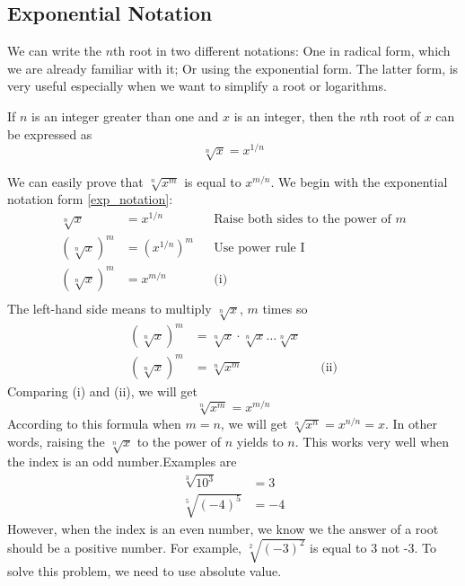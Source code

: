 \subsection{Exponential Notation}
We can write the $n$th root in two different notations: One in radical form, which
we are already familiar with it; Or using the exponential form. The latter form,
is very useful especially when we want to simplify a root or logarithms.
\begin{tcolorbox}[title=Exponential Notation, fonttitle=\bfseries,
                 colframe=blue!70!red,
                 colback =white]
If $n$ is an integer greater than one and $x$ is an integer, then the $n$th root of $x$ can be expressed as 
						\begin{equation}
 								\sqrt[n]{x}=x^{1/n} \label{exp_notation}
 						\end{equation}	
\end{tcolorbox}
We can easily prove that $\sqrt[n]{x^m}$ is equal to $x^{m/n}$. We begin with the exponential notation form \eqref{exp_notation}:
\begin{align*}
		\sqrt[n]{x} &= x^{1/n} 		&&\text{Raise both sides to the power of $m$}\\
		\left(\sqrt[n]{x}\right)^{m} &= \left(x^{1/n}\right)^m &&\text{Use power rule I}\\
		\left(\sqrt[n]{x}\right)^{m} &= x^{m/n} &&\text{(i)}\\
\end{align*}
The left-hand side means to multiply $\sqrt[n]{x}$, $m$ times so
	\begin{align*}
			\left(\sqrt[n]{x}\right)^{m} &= \sqrt[n]{x}\cdot \sqrt[n]{x}\ldots\sqrt[n]{x} &&\\
		\left(\sqrt[n]{x}\right)^{m} &= \sqrt[n]{x^m} &&\text{(ii)}
	\end{align*}
Comparing (i) and (ii), we will get
\begin{equation*}
				\sqrt[n]{x^m} = x^{m/n}
\end{equation*}
According to this formula when $m=n$, we will get $\sqrt[n]{x^n}=x^{n/n}=x$. In other words, raising the $\sqrt[n]{x}$ to the power of $n$ yields to
$n$. This works very well when the index is an odd number.Examples are
\begin{align*}
			\sqrt[3]{10^3} &= 3\\
			\sqrt[5]{(-4)^5} &= -4
\end{align*}
However, when the index is an even number, we know we the answer of a root should
be a positive number. For example, $\sqrt[2]{(-3)^2}$ is equal to 3 not -3. To solve this problem,  we need to use absolute value.

